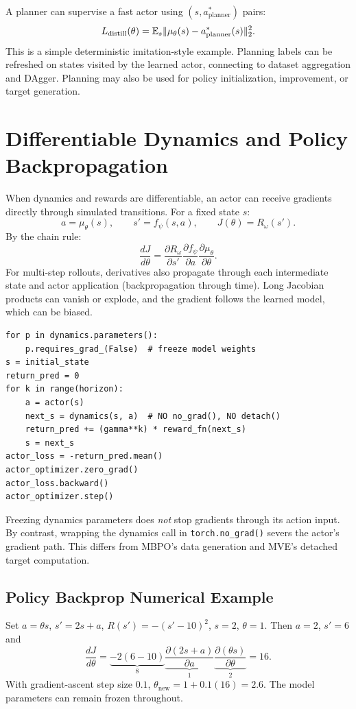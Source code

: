 A planner can supervise a fast actor using $(s,a^*_{\mathrm{planner}})$ pairs:
\begin{equation}
L_{\mathrm{distill}}(\theta)=
\mathbb{E}_s\|\mu_\theta(s)-a^*_{\mathrm{planner}}(s)\|_2^2.
\end{equation}
This is a simple deterministic imitation-style example. Planning labels can be refreshed on states visited by the learned actor, connecting to dataset aggregation and DAgger. Planning may also be used for policy initialization, improvement, or target generation.

\section{Differentiable Dynamics and Policy Backpropagation}
When dynamics and rewards are differentiable, an actor can receive gradients directly through simulated transitions. For a fixed state $s$:
\begin{equation}
a=\mu_\theta(s),\qquad s'=f_\psi(s,a),\qquad
J(\theta)=R_\omega(s').
\end{equation}
By the chain rule:
\begin{equation}
\frac{dJ}{d\theta}
=
\frac{\partial R_\omega}{\partial s'}
\frac{\partial f_\psi}{\partial a}
\frac{\partial\mu_\theta}{\partial\theta}.
\end{equation}
For multi-step rollouts, derivatives also propagate through each intermediate state and actor application (backpropagation through time). Long Jacobian products can vanish or explode, and the gradient follows the learned model, which can be biased.
\begin{verbatim}
for p in dynamics.parameters():
    p.requires_grad_(False)  # freeze model weights
s = initial_state
return_pred = 0
for k in range(horizon):
    a = actor(s)
    next_s = dynamics(s, a)  # NO no_grad(), NO detach()
    return_pred += (gamma**k) * reward_fn(next_s)
    s = next_s
actor_loss = -return_pred.mean()
actor_optimizer.zero_grad()
actor_loss.backward()
actor_optimizer.step()
\end{verbatim}
Freezing dynamics parameters does \emph{not} stop gradients through its action input. By contrast, wrapping the dynamics call in \texttt{torch.no\_grad()} severs the actor's gradient path. This differs from MBPO's data generation and MVE's detached target computation.

\subsection{Policy Backprop Numerical Example}
Set $a=\theta s$, $s'=2s+a$, $R(s')=-(s'-10)^2$, $s=2$, $\theta=1$. Then $a=2$, $s'=6$ and
\begin{equation}
\frac{dJ}{d\theta}
=\underbrace{-2(6-10)}_{8}
\underbrace{\frac{\partial(2s+a)}{\partial a}}_{1}
\underbrace{\frac{\partial(\theta s)}{\partial\theta}}_{2}
=16.
\end{equation}
With gradient-ascent step size $0.1$, $\theta_{\mathrm{new}}=1+0.1(16)=2.6$. The model parameters can remain frozen throughout.

